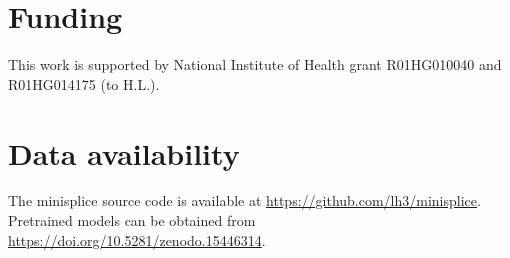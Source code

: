 \documentclass[webpdf,contemporary,large,namedate]{oup-authoring-template}%
\begin{document}
\section*{Funding}

This work is supported by National Institute of Health grant R01HG010040 and R01HG014175 (to H.L.).

\section*{Data availability}

The minisplice source code is available at \url{https://github.com/lh3/minisplice}.
Pretrained models can be obtained from \url{https://doi.org/10.5281/zenodo.15446314}.


{\sffamily\small
}
\end{document}
